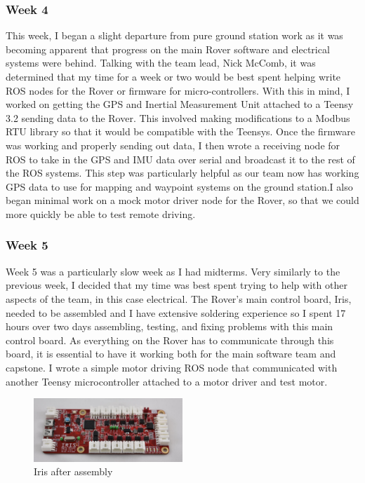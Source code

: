 \subsubsection{Week 4}
This week, I began a slight departure from pure ground station work as it was becoming apparent that progress on the main Rover software and electrical systems were behind. Talking with the team lead, Nick McComb, it was determined that my time for a week or two would be best spent helping write ROS nodes for the Rover or firmware for micro-controllers. With this in mind, I worked on getting the GPS and Inertial Measurement Unit attached to a Teensy 3.2 sending data to the Rover. This involved making modifications to a Modbus RTU library so that it would be compatible with the Teensys. Once the firmware was working and properly sending out data, I then wrote a receiving node for ROS to take in the GPS and IMU data over serial and broadcast it to the rest of the ROS systems. This step was particularly helpful as our team now has working GPS data to use for mapping and waypoint systems on the ground station.I also began minimal work on a mock motor driver node for the Rover, so that we could more quickly be able to test remote driving.

\subsubsection{Week 5}
Week 5 was a particularly slow week as I had midterms. Very similarly to the previous week, I decided that my time was best spent trying to help with other aspects of the team, in this case electrical. The Rover's main control board, Iris, needed to be assembled and I have extensive soldering experience so I spent 17 hours over two days assembling, testing, and fixing problems with this main control board. As everything on the Rover has to communicate through this board, it is essential to have it working both for the main software team and capstone. I wrote a simple motor driving ROS node that communicated with another Teensy microcontroller attached to a motor driver and test motor.
\begin{figure}[h!]
  \centering
  \captionsetup{justification=centering}
  \includegraphics[width=0.5\textwidth]{figures/iris}
  \caption{Iris after assembly}
\end{figure}


